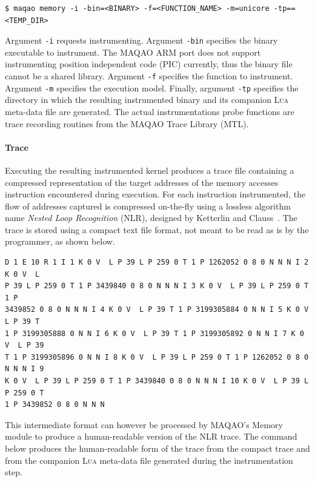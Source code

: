 \documentclass[11pt, a4paper, twoside]{montblanc2}
\def\lua{\textsc{Lua}\xspace}
\begin{document}
\begin{verbatim}
$ maqao memory -i -bin=<BINARY> -f=<FUNCTION_NAME> -m=unicore -tp==<TEMP_DIR>
\end{verbatim}

Argument \verb|-i| requests instrumenting. Argument \verb|-bin| specifies the
binary executable to instrument. The MAQAO ARM port does not support
instrumenting position independent code (PIC) currently, thus the binary file
cannot be a shared library. Argument \verb|-f| specifies the function to
instrument. Argument \verb|-m| specifies the execution model. Finally, argument
\verb|-tp| specifies the directory in which the resulting instrumented binary
and its companion \lua meta-data file are generated. The actual instrumentations 
probe functions are trace recording routines from the MAQAO Trace Library (MTL).

\paragraph{Trace}

Executing the resulting instrumented kernel produces a trace file containing a 
compressed representation of the target addresses of the memory accesses 
instruction encountered during execution. For each instruction instrumented, the 
flow of addresses captured is compressed on-the-fly using a lossless
algorithm name \emph{Nested Loop Recognition} (NLR), designed by Ketterlin and 
Clauss~\cite{ketterlin:nlr:cgo:2008}. The trace is stored using a compact text 
file format, not meant to be read as is by the programmer, as shown below.

\begin{footnotesize}
\begin{verbatim}
D 1 E 10 R 1 I 1 K 0 V  L P 39 L P 259 0 T 1 P 1262052 0 8 0 N N N I 2 K 0 V  L 
P 39 L P 259 0 T 1 P 3439840 0 8 0 N N N I 3 K 0 V  L P 39 L P 259 0 T 1 P 
3439852 0 8 0 N N N I 4 K 0 V  L P 39 T 1 P 3199305884 0 N N I 5 K 0 V  L P 39 T 
1 P 3199305888 0 N N I 6 K 0 V  L P 39 T 1 P 3199305892 0 N N I 7 K 0 V  L P 39 
T 1 P 3199305896 0 N N I 8 K 0 V  L P 39 L P 259 0 T 1 P 1262052 0 8 0 N N N I 9 
K 0 V  L P 39 L P 259 0 T 1 P 3439840 0 8 0 N N N I 10 K 0 V  L P 39 L P 259 0 T 
1 P 3439852 0 8 0 N N N 
\end{verbatim}
\end{footnotesize}

This intermediate format can however be processed by MAQAO's Memory module to 
produce a human-readable version of the NLR trace. The command below produces
the human-readable form of the trace from the compact trace and from the companion
\lua meta-data file generated during the instrumentation step.
 
\end{document}
